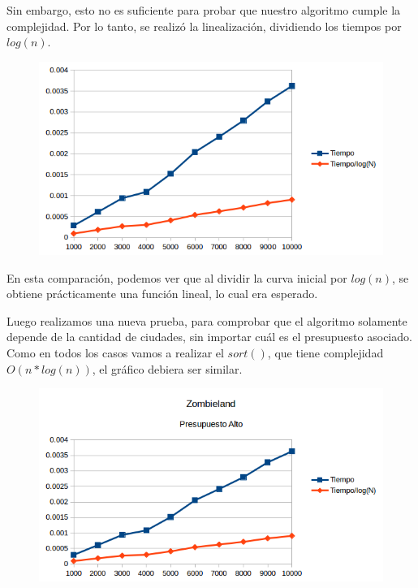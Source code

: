 Sin embargo, esto no es suficiente para probar que nuestro algoritmo cumple la complejidad. Por lo tanto, se realiz\'o la linealizaci\'on, dividiendo los tiempos por $log(n)$.

\newpage

 \begin{figure}[h!]
   \begin{center}
 	\includegraphics{imagenes/ej1/Mediciones/Grafico2.png}
   \end{center}
 \end{figure}

 En esta comparaci\'on, podemos ver que al dividir la curva inicial por $log(n)$, se obtiene pr\'acticamente una funci\'on lineal, lo cual era esperado.
 
Luego realizamos una nueva prueba, para comprobar que el algoritmo solamente depende de la cantidad de ciudades, sin importar cu\'al es el presupuesto asociado.
Como en todos los casos vamos a realizar el $sort()$, que tiene complejidad $O(n*log(n))$, el gr\'afico debiera ser similar.

 \begin{figure}[h!]
   \begin{left}
 	\includegraphics{imagenes/ej1/Mediciones/Grafico3.png}
   \end{left}
 \end{figure}
 
